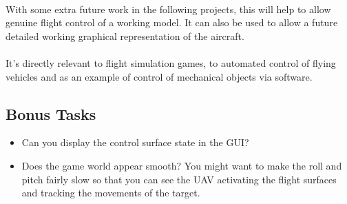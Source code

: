 \documentclass[11pt]{book}
\begin{document}
\paragraph{} With some extra future work in the following projects, this will
help to allow genuine flight control of a working model. It can also be used
to allow a future detailed working graphical representation of the aircraft.

\paragraph{} It's directly relevant to flight simulation games, to automated
control of flying vehicles and as an example of control of mechanical objects
via software.

\subsection{Bonus Tasks}

\begin{itemize}
\item Can you display the control surface state in the GUI?
\item Does the game world appear smooth? You might want to make the roll and pitch fairly slow so that you can see the UAV activating the flight surfaces and tracking the movements of the target.
\end{itemize}

\clearpage
\end{document}
